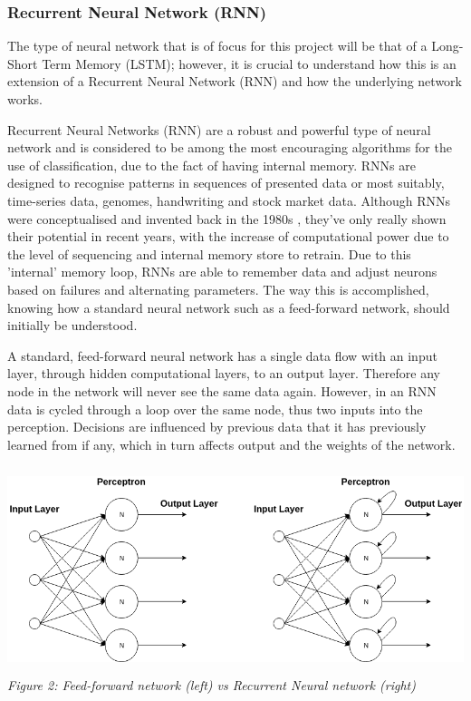 \documentclass[oneside, 12pt]{article}
\begin{document}
			\subsubsection{Recurrent Neural Network (RNN)}\label{types}
			The type of neural network that is of focus for this project will be that of a Long-Short Term Memory (LSTM); however, it is crucial to understand how this is an extension of a Recurrent Neural Network (RNN) and how the underlying network works.
			
			Recurrent Neural Networks (RNN) are a robust and powerful type of neural network and is considered to be among the most encouraging algorithms for the use of classification, due to the fact of having internal memory. RNNs are designed to recognise patterns in sequences of presented data or most suitably, time-series data, genomes, handwriting and stock market data. Although RNNs were conceptualised and invented back in the 1980s \cite{17}, they've only really shown their potential in recent years, with the increase of computational power due to the level of sequencing and internal memory store to retrain.
			Due to this 'internal' memory loop, RNNs are able to remember data and adjust neurons based on failures and alternating parameters. The way this is accomplished, knowing how a standard neural network such as a feed-forward network, should initially be understood. \cite{18}
			
			A standard, feed-forward neural network has a single data flow with an input layer, through hidden computational layers, to an output layer. Therefore any node in the network will never see the same data again. However, in an RNN data is cycled through a loop over the same node, thus two inputs into the perception. Decisions are influenced by previous data that it has previously learned from if any, which in turn affects output and the weights of the network. \cite{19}
			
			\begin{center}
				\includegraphics[width=15cm,height=6cm]{images/rnn_ffn.png}
				\newline
				\textit{Figure 2: Feed-forward network (left) vs Recurrent Neural network (right)}
			\end{center}
		
\end{document}
